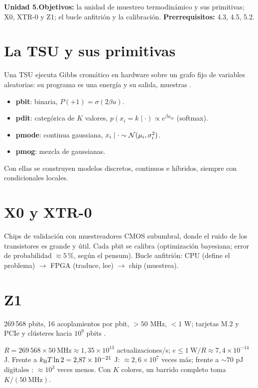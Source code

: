 \documentclass[11pt,a4paper]{article}
\begin{document}

\noindent\textbf{Unidad 5.}\quad\textbf{Objetivos:} la unidad de muestreo termodinámico y sus primitivas; X0, XTR-0 y Z1; el bucle anfitrión y la calibración.
\textbf{Prerrequisitos:} 4.3, 4.5, 5.2.

\section{La TSU y sus primitivas}
Una TSU ejecuta Gibbs cromático en hardware sobre un grafo fijo de variables aleatorias: su programa es una energía y su salida, muestras \cite{e1}.
\begin{itemize}[nosep]
\item \textbf{pbit}: binaria, $P(+1)=\sigma(2\beta u)$.
\item \textbf{pdit}: categórica de $K$ valores, $p(x_i=k\mid\cdot)\propto e^{\beta u_{ik}}$ (softmax).
\item \textbf{pmode}: continua gaussiana, $x_i\mid\cdot\sim\mathcal{N}(\mu_i,\sigma_i^2)$.
\item \textbf{pmog}: mezcla de gaussianas.
\end{itemize}
Con ellas se construyen modelos discretos, continuos e híbridos, siempre con condicionales locales.

\section{X0 y XTR-0}
Chips de validación con muestreadores CMOS subumbral, donde el ruido de los transistores es grande y útil. Cada pbit se calibra (optimización bayesiana;
error de probabilidad $\approx5\,\%$, según el pensum). Bucle anfitrión: CPU (define el problema) $\to$ FPGA (traduce, lee) $\to$ chip (muestrea).

\section{Z1}
269\,568 pbits, 16 acoplamientos por pbit, $>50$ MHz, $<1$ W; tarjetas M.2 y PCIe y clústeres hacia $10^9$ pbits \cite{e2}.
\begin{ejemplo}
$R=269\,568\times50\ \text{MHz}\approx1{,}35\times10^{13}$ actualizaciones/s; $e\le1\ \text{W}/R\approx7{,}4\times10^{-14}$ J. Frente a
$k_{\mathrm B} T\ln2=2{,}87\times10^{-21}$ J: $\approx2{,}6\times10^7$ veces más; frente a $\sim70$ pJ digitales \evE: $\approx10^3$ veces menos. Con $K$ colores, un
barrido completo toma $K/(50\ \text{MHz})$.
\end{ejemplo}
\end{document}
